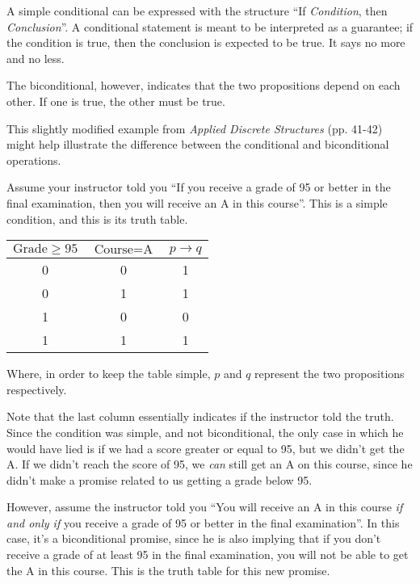 \documentclass{article}
\begin{document}
A simple conditional can be expressed with the structure ``If
\textit{Condition}, then \textit{Conclusion}''. A conditional statement is meant
to be interpreted as a guarantee; if the condition is true, then the conclusion
is expected to be true. It says no more and no less.

The biconditional, however, indicates that the two propositions depend on each
other. If one is true, the other must be true.

This slightly modified example from \textit{Applied Discrete Structures}
(pp. 41-42) might help illustrate the difference between the conditional and
biconditional operations.

Assume your instructor told you ``If you receive a grade of 95 or better in the
final examination, then you will receive an A in this course''. This is a simple
condition, and this is its truth table.

\bigskip
\begin{center}
  \begin{tabular}{| c | c | c |}
    \hline
    $\text{Grade} \geq 95$ & $\text{Course} = \text{A}$ & $p \to q$ \\
    \hline
    0 & 0 & 1 \\
    0 & 1 & 1 \\
    1 & 0 & 0 \\
    1 & 1 & 1 \\
    \hline
  \end{tabular}
\end{center}
\bigskip

Where, in order to keep the table simple, $p$ and $q$ represent the two
propositions respectively.

Note that the last column essentially indicates if the instructor told the
truth. Since the condition was simple, and not biconditional, the only case in
which he would have lied is if we had a score greater or equal to 95, but we
didn't get the A. If we didn't reach the score of 95, we \textit{can} still get
an A on this course, since he didn't make a promise related to us getting a
grade below 95.

However, assume the instructor told you ``You will receive an A in this course
\textit{if and only if} you receive a grade of 95 or better in the final
examination''. In this case, it's a biconditional promise, since he is also
implying that if you don't receive a grade of at least 95 in the final
examination, you will not be able to get the A in this course. This is the truth
table for this new promise.
\end{document}
